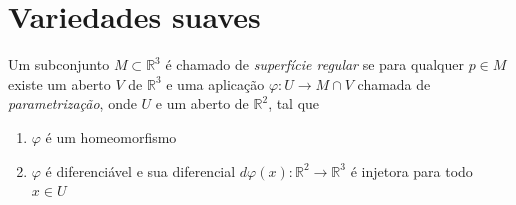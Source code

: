 \section{Variedades suaves}

\begin{defi}
Um subconjunto $M \subset \mathbb{R}^3$ é chamado de \emph{superfície regular} se para qualquer $p \in M$ existe um aberto $V$ de $\mathbb{R}^3$ e uma aplicação $\varphi: U \rightarrow M \cap V$ chamada de \emph{parametrização}, onde $U$ e um aberto de $\mathbb{R}^2$, tal que
\begin{enumerate}
    \item $\varphi$ é um homeomorfismo
    \item $\varphi$ é diferenciável e sua diferencial $d\varphi(x): \mathbb{R}^2 \rightarrow \mathbb{R}^3$ é injetora para todo $x \in U$
\end{enumerate}
\end{defi}

